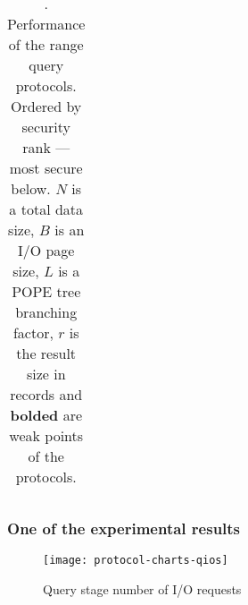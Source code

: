 \begin{frame}[label={frame:appendix:protocols}]
\begin{table}
\begin{adjustbox}{width=\linewidth}
\begin{tabular}{ l c c c c c }
					\bottomrule

				\end{tabular}
			\end{adjustbox}
			\captionsetup{justification=justified}
			\caption{
				\cite[Tables 2]{ore-benchmark-17}.
				Performance of the range query protocols.
				Ordered by security rank --- most secure below.
				$N$ is a total data size, $B$ is an I/O page size, $L$ is a POPE tree branching factor, $r$ is the result size in records and \textbf{bolded} are weak points of the protocols.
			}
		\end{table}

	\begin{flushright}
		\hyperlink{frame:ore}{}
	\end{flushright}

	\end{frame}

	\begin{frame}[label={frame:appendix:plot}]

		\frametitle{One of the experimental results}

		\begin{figure}[h]
			\centering
			\texttt{[image: protocol-charts-qios]}
			\caption{
				Query stage number of I/O requests \\
				\hyperlink{frame:ore}{}
			}
		\end{figure}

	\end{frame}

